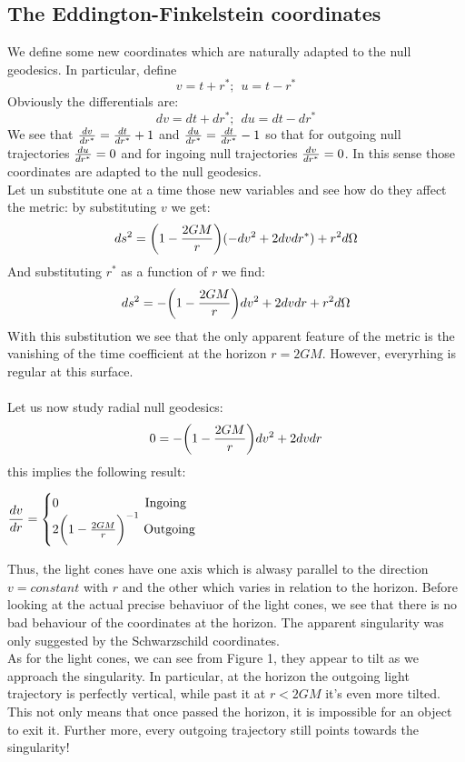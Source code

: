 \documentclass[]{article}
\theoremstyle{definition}
\theoremstyle{Theorem}
\theoremstyle{definition}
\theoremstyle{definition}
\theoremstyle{definition}
\begin{document}
\subsection{The Eddington-Finkelstein coordinates}
We define some new coordinates which are naturally adapted to the null geodesics. In particular, define
$$v=t+r^*;\hspace{5pt} u=t-r^*$$
Obviously the differentials are:
$$dv=dt+dr^*;\hspace{5pt} du=dt-dr^*$$
We see that ${dv\over dr^*}={dt\over dr^*}+1$ and ${du\over dr^*}={dt\over dr^*}-1$ so that for outgoing null trajectories ${du\over dr^*}=0$ and for ingoing null trajectories ${dv\over dr^*}=0$. In this sense those coordinates are adapted to the null geodesics.\\
Let un substitute one at a time those new variables and see how do they affect the metric: by substituting $v$ we get:
$$ds^2=\bigg(1-{2GM\over r}\bigg)(-dv^2+2dvdr^*)+r^2d\Omega$$
And substituting $r^*$ as a function of $r$ we find:
$$ds^2=-\bigg(1-{2GM\over r}\bigg)dv^2+2dvdr+r^2d\Omega$$
With this substitution we see that the only apparent feature of the metric is the vanishing of the time coefficient at the horizon $r=2GM$. However, everyrhing is regular at this surface.\\
\\
Let us now study radial null geodesics: 
$$0=-\bigg(1-{2GM\over r}\bigg)dv^2+2dvdr$$
this implies the following result:
\\
\begin{center}
	\begin{math}
		\displaystyle {dv\over dr}=
		\begin{cases}
			0 \mbox{\hspace{68pt}Ingoing}\\
			2\bigg(1-{2GM\over r}\bigg)^{-1} \mbox{  Outgoing}
		\end{cases}
	\end{math}
\end{center}
Thus, the light cones have one axis which is alwasy parallel to the direction $v=constant$ with $r$ and the other which varies in relation to the horizon. Before looking at the actual precise behaviuor of the light cones, we see that there is no bad behaviour of the coordinates at the horizon. The apparent singularity was only suggested by the Schwarzschild coordinates.\\
As for the light cones, we can see from Figure 1, they appear to tilt as we approach the singularity. In particular, at the horizon the outgoing light trajectory is perfectly vertical, while past it at $r<2GM$ it's even more tilted. This not only means that once passed the horizon, it is impossible for an object to exit it. Further more, every outgoing trajectory still points towards the singularity!\\
\end{document}
